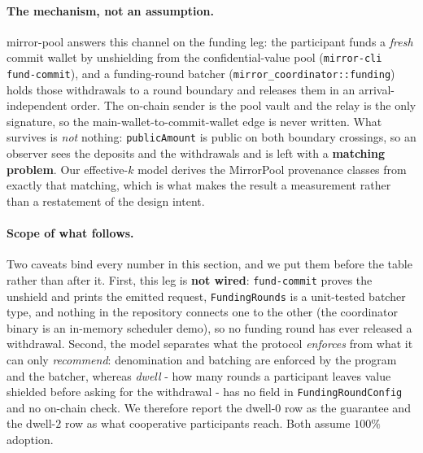 \documentclass[10pt]{article}
\newcommand{\code}[1]{\texttt{#1}}
\begin{document}
\paragraph{The mechanism, not an assumption.} mirror-pool answers this channel on
the funding leg: the participant funds a \emph{fresh} commit wallet by unshielding
from the confidential-value pool (\code{mirror-cli fund-commit}), and a funding-round
batcher (\code{mirror\_coordinator::funding}) holds those withdrawals to a round
boundary and releases them in an arrival-independent order. The on-chain sender is
the pool vault and the relay is the only signature, so the
main-wallet-to-commit-wallet edge is never written. What survives is \emph{not}
nothing: \code{publicAmount} is public on both boundary crossings, so an observer
sees the deposits and the withdrawals and is left with a \textbf{matching problem}.
Our effective-$k$ model derives the MirrorPool provenance classes from exactly that
matching, which is what makes the result a measurement rather than a restatement of
the design intent.

\paragraph{Scope of what follows.} Two caveats bind every number in this section,
and we put them before the table rather than after it. First, this leg is
\textbf{not wired}: \code{fund-commit} proves the unshield and prints the emitted
request, \code{FundingRounds} is a unit-tested batcher type, and nothing in the
repository connects one to the other (the coordinator binary is an in-memory
scheduler demo), so no funding round has ever released a withdrawal. Second, the
model separates what the protocol \emph{enforces} from what it can only
\emph{recommend}: denomination and batching are enforced by the program and the
batcher, whereas \emph{dwell} - how many rounds a participant leaves value shielded
before asking for the withdrawal - has no field in \code{FundingRoundConfig} and no
on-chain check. We therefore report the dwell-$0$ row as the guarantee and the
dwell-$2$ row as what cooperative participants reach. Both assume $100\%$ adoption.
\end{document}
